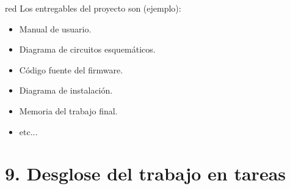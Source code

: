 \documentclass[
11pt, %
codirector, %
]{charter}
\begin{document}
\begin{consigna}{red}
	Los entregables del proyecto son (ejemplo):

	\begin{itemize}
		\item Manual de usuario.
		\item Diagrama de circuitos esquemáticos.
		\item Código fuente del firmware.
		\item Diagrama de instalación.
		\item Memoria del trabajo final.
		\item etc...
	\end{itemize}
\end{consigna}

\section{9. Desglose del trabajo en tareas}
\label{sec:wbs}
\end{document}
